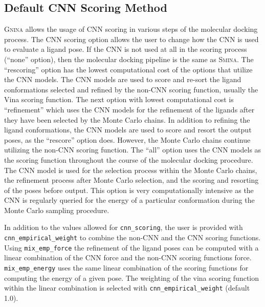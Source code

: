 \documentclass[journal=jcisd8,manuscript=article]{achemso}
\begin{document}
\subsection{Default CNN Scoring Method}
\textsc{Gnina} allows the usage of CNN scoring in various steps of the molecular docking process. The CNN scoring option allows the user to change how the CNN is used to evaluate a ligand pose. If the CNN is not used at all in the scoring process (``none'' option), then the molecular docking pipeline is the same as \textsc{Smina}. The ``rescoring'' option has the lowest computational cost of the options that utilize the CNN models. The CNN models are used to score and re-sort the ligand conformations selected and refined by the non-CNN scoring function, usually the Vina scoring function. The next option with lowest computational cost is ``refinement'' which uses the CNN models for the refinement of the ligands after they have been selected by the Monte Carlo chains. In addition to refining the ligand conformations, the CNN models are used to score and resort the output poses, as the ``rescore'' option does. However, the Monte Carlo chains continue utilizing the non-CNN scoring function. The ``all'' option uses the CNN models as the scoring function throughout the course of the molecular docking procedure. The CNN model is used for the selection process within the Monte Carlo chains, the refinement process after Monte Carlo selection, and the scoring and resorting of the poses before output. This option is very computationally intensive as the CNN is regularly queried for the energy of a particular conformation during the Monte Carlo sampling procedure.

In addition to the values allowed for \texttt{cnn\_scoring}, the user is provided with \texttt{cnn\_empirical\_weight} to combine the non-CNN and the CNN scoring functions. Using \texttt{mix\_emp\_force} the refinement of the ligand poses can be computed with a linear combination of the CNN force and the non-CNN scoring functions force. \texttt{mix\_emp\_energy} uses the same linear combination of the scoring functions for computing the energy of a given pose. The weighting of the vina scoring function within the linear combination is selected with \texttt{cnn\_empirical\_weight} (default 1.0). 
\end{document}
